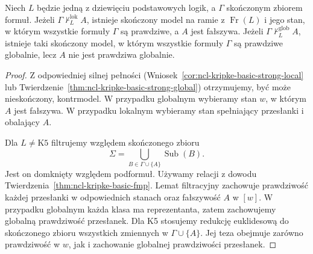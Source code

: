 \begin{wniosek}
\label{cor:ncl-kripke-finite-premise-countermodels}
Niech $L$ będzie jedną z dziewięciu podstawowych
logik, a $\Gamma$ skończonym zbiorem formuł.
Jeżeli $\Gamma\not\vdash_L^{\mathrm{lok}}A$,
istnieje skończony model na ramie z
$\operatorname{Fr}(L)$ i jego stan,
w którym wszystkie formuły $\Gamma$ są
prawdziwe, a $A$ jest fałszywa.
Jeżeli $\Gamma\not\vdash_L^{\mathrm{glob}}A$,
istnieje taki skończony model, w którym
wszystkie formuły $\Gamma$ są prawdziwe
globalnie, lecz $A$ nie jest prawdziwa globalnie.
\end{wniosek}
\begin{proof}
Z odpowiedniej silnej pełności
(Wniosek~\ref{cor:ncl-kripke-basic-strong-local}
lub
Twierdzenie~\ref{thm:ncl-kripke-basic-strong-global})
otrzymujemy, być może nieskończony, kontrmodel.
W przypadku globalnym wybieramy stan $w$,
w którym $A$ jest fałszywa.
W przypadku lokalnym wybieramy stan
spełniający przesłanki i obalający $A$.

Dla $L\ne\mathrm{K5}$ filtrujemy względem
skończonego zbioru
\[
 \Sigma=\bigcup_{B\in\Gamma\cup\{A\}}
             \operatorname{Sub}(B).
\]
Jest on domknięty względem podformuł.
Używamy relacji z dowodu
Twierdzenia~\ref{thm:ncl-kripke-basic-fmp}.
Lemat filtracyjny zachowuje prawdziwość
każdej przesłanki w odpowiednich stanach
oraz fałszywość $A$ w $[w]$.
W przypadku globalnym każda klasa ma
reprezentanta, zatem zachowujemy globalną
prawdziwość przesłanek.
Dla K5 stosujemy redukcję euklidesową
do skończonego zbioru wszystkich zmiennych
w $\Gamma\cup\{A\}$. Jej teza obejmuje
zarówno prawdziwość w $w$, jak i zachowanie
globalnej prawdziwości przesłanek.
\end{proof}

